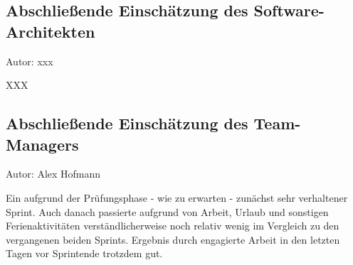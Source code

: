 \subsection{Abschließende Einschätzung des Software-Architekten}
{\small Autor: xxx}

XXX

\subsection{Abschließende Einschätzung des Team-Managers}
{\small Autor: Alex Hofmann}

Ein aufgrund der Prüfungsphase - wie zu erwarten - zunächst sehr verhaltener Sprint.
Auch danach passierte aufgrund von Arbeit, Urlaub und sonstigen Ferienaktivitäten verständlicherweise noch relativ wenig im Vergleich zu den vergangenen beiden Sprints. Ergebnis durch engagierte Arbeit in den letzten Tagen vor Sprintende trotzdem gut.

